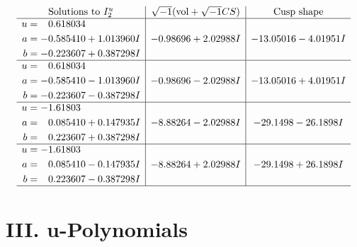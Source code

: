 \documentclass[1p]{elsarticle_modified}
\theoremstyle{definition}
\newcommand{\I}{\sqrt{-1}}
\begin{document}
$$\begin{array}{c|c|c}  
\text{Solutions to }I^u_{2}& \I (\text{vol} + \sqrt{-1}CS) & \text{Cusp shape}\\
 \hline 
\begin{aligned}
u &= \phantom{-}0.618034\phantom{ +0.000000I} \\
a &= -0.585410 + 1.013960 I \\
b &= -0.223607 + 0.387298 I\end{aligned}
 & -0.98696 + 2.02988 I & -13.05016 - 4.01951 I \\ \hline\begin{aligned}
u &= \phantom{-}0.618034\phantom{ +0.000000I} \\
a &= -0.585410 - 1.013960 I \\
b &= -0.223607 - 0.387298 I\end{aligned}
 & -0.98696 - 2.02988 I & -13.05016 + 4.01951 I \\ \hline\begin{aligned}
u &= -1.61803\phantom{ +0.000000I} \\
a &= \phantom{-}0.085410 + 0.147935 I \\
b &= \phantom{-}0.223607 + 0.387298 I\end{aligned}
 & -8.88264 - 2.02988 I & -29.1498 - 26.1898 I \\ \hline\begin{aligned}
u &= -1.61803\phantom{ +0.000000I} \\
a &= \phantom{-}0.085410 - 0.147935 I \\
b &= \phantom{-}0.223607 - 0.387298 I\end{aligned}
 & -8.88264 + 2.02988 I & -29.1498 + 26.1898 I\\
 \hline 
 \end{array}$$\newpage
\newpage\renewcommand{\arraystretch}{1}
\centering \section*{ III. u-Polynomials}
\end{document}
